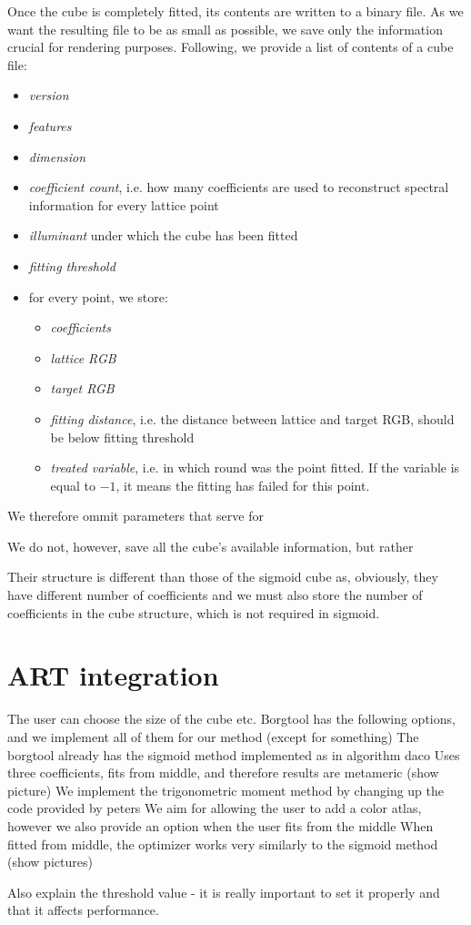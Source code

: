 Once the cube is completely fitted, its contents are written to a binary file. As we want the resulting file to be as small as possible, we save only the information crucial for rendering purposes. Following, we provide a list of contents of a cube file:
\begin{itemize}
	\item \emph{version}
	\item \emph{features}
	\item \emph{dimension}
	\item \emph{coefficient count}, i.e. how many coefficients are used to reconstruct spectral information for every lattice point
	\item \emph{illuminant} under which the cube has been fitted
	\item \emph{fitting threshold}
	\item for every point, we store:
	\begin{itemize}
		\item \emph{coefficients}
		\item \emph{lattice RGB}
		\item \emph{target RGB}
		\item \emph{fitting distance}, i.e. the distance between lattice and target RGB, should be below fitting threshold
		\item \emph{treated variable}, i.e. in which round was the point fitted. If the variable is equal to $-1$, it means the fitting has failed for this point.
	\end{itemize}
\end{itemize}

We therefore ommit parameters that serve for 

We do not, however, save all the cube's available information, but rather 

 Their structure is different than those of the sigmoid cube as, obviously, they have different number of coefficients and we must also store the number of coefficients in the cube structure, which is not required in sigmoid.





\section{ART integration}

The user can choose the size of the cube etc. Borgtool has the following options, and we implement all of them for our method (except for something)
The borgtool already has the sigmoid method implemented as in algorithm daco
Uses three coefficients, fits from middle, and therefore results are metameric (show picture)
We implement the trigonometric moment method by changing up the code provided by peters
We aim for allowing the user to add a color atlas, however we also provide an option when the user fits from the middle
When fitted from middle, the optimizer works very similarly to the sigmoid method (show pictures)

Also explain the threshold value - it is really important to set it properly and that it affects performance.

